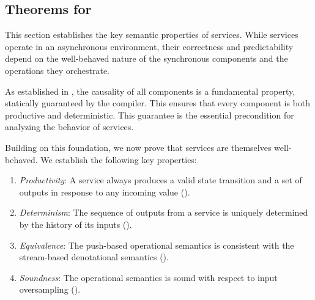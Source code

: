\subsection{Theorems for \GRFRP}
\label{sec:semantics:grfrp:theorems}

This section establishes the key semantic properties of \GRFRP services. While services operate in
an asynchronous environment, their correctness and predictability depend on the well-behaved nature
of the synchronous \GRSync components and the \GReact operations they orchestrate.

As established in , the causality of all \GRSync components is a
fundamental property, statically guaranteed by the compiler. This ensures that every component is
both productive and deterministic. This guarantee is the essential precondition for analyzing the
behavior of \GRFRP services.

Building on this foundation, we now prove that \GRFRP services are themselves well-behaved. We
establish the following key properties:
\begin{enumerate}
      \item \emph{Productivity}: A service always produces a valid state transition and a
            set of outputs in response to any incoming value
            ().
      \item \emph{Determinism}: The sequence of outputs from a service is uniquely
            determined by the history of its inputs
            ().
      \item \emph{Equivalence}: The push-based operational semantics is consistent with the
            stream-based denotational semantics ().
      \item \emph{Soundness}: The operational semantics is sound with respect to input
            oversampling ().
\end{enumerate}








